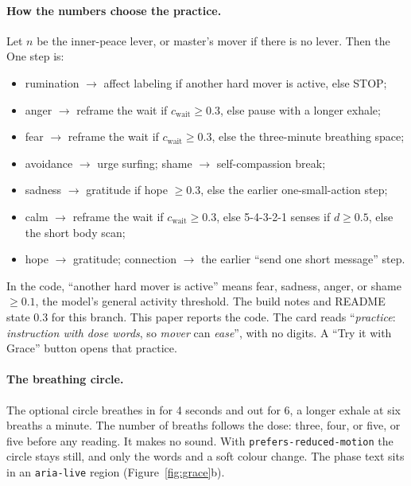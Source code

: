\documentclass[10pt]{article}
\theoremstyle{definition}
\theoremstyle{remark}
\begin{document}
\paragraph{How the numbers choose the practice.} Let $n$ be the inner-peace lever, or master's mover if there is no lever. Then the One step is:
\begin{itemize}
\item rumination $\to$ affect labeling if another hard mover is active, else STOP;
\item anger $\to$ reframe the wait if $c_{\mathrm{wait}}\ge0.3$, else pause with a longer exhale;
\item fear $\to$ reframe the wait if $c_{\mathrm{wait}}\ge0.3$, else the three-minute breathing space;
\item avoidance $\to$ urge surfing; shame $\to$ self-compassion break;
\item sadness $\to$ gratitude if hope $\ge0.3$, else the earlier one-small-action step;
\item calm $\to$ reframe the wait if $c_{\mathrm{wait}}\ge0.3$, else 5-4-3-2-1 senses if $d\ge0.5$, else the short body scan;
\item hope $\to$ gratitude; connection $\to$ the earlier ``send one short message'' step.
\end{itemize}
In the code, ``another hard mover is active'' means fear, sadness, anger, or shame $\ge0.1$, the model's general activity threshold. The build notes and README state $0.3$ for this branch. This paper reports the code. The card reads ``\emph{practice}: \emph{instruction with dose words}, so \emph{mover} can \emph{ease}'', with no digits. A ``Try it with Grace'' button opens that practice.

\paragraph{The breathing circle.} The optional circle breathes in for 4 seconds and out for 6, a longer exhale at six breaths a minute. The number of breaths follows the dose: three, four, or five, or five before any reading. It makes no sound. With \texttt{prefers-reduced-motion} the circle stays still, and only the words and a soft colour change. The phase text sits in an \texttt{aria-live} region (Figure~\ref{fig:grace}b).

\end{document}
